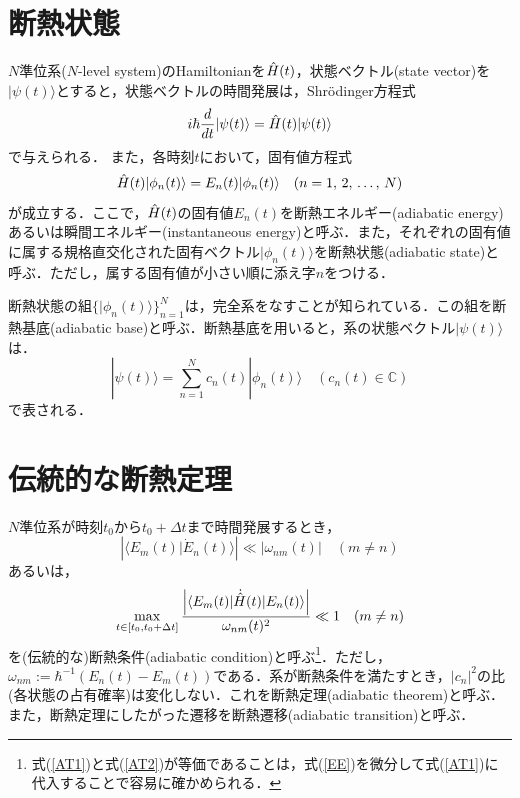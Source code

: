 \documentclass[a4paper, titlepage]{jsreport}
\begin{document}
\section{断熱状態}
$N$準位系($N$-level system)のHamiltonianを$\Hat{H}(t)$，状態ベクトル(state vector)を$|\psi(t)\rangle$とすると，状態ベクトルの時間発展は，Shr\"{o}dinger方程式
\begin{equation}
  \label{SE}
  i\hbar \frac{d}{dt} |\psi(t) \rangle = \Hat{H}(t) |\psi(t) \rangle
\end{equation}
で与えられる．
また，各時刻$t$において，固有値方程式
\begin{equation} 
  \Hat{H}(t) |\phi_n(t) \rangle = E_n(t) |\phi_n(t) \rangle \quad (n = 1,\,2,\,\ldots,\,N) \label{EE}
\end{equation}
が成立する．ここで，$\Hat{H}(t)$の固有値$E_n(t)$を断熱エネルギー(adiabatic energy)あるいは瞬間エネルギー(instantaneous energy)と呼ぶ．また，それぞれの固有値に属する規格直交化された固有ベクトル$|\phi_n(t) \rangle$を断熱状態(adiabatic state)と呼ぶ．ただし，属する固有値が小さい順に添え字$n$をつける．


断熱状態の組$\{|\phi_n(t) \rangle\}_{n=1}^N$は，完全系をなすことが知られている．この組を断熱基底(adiabatic base)と呼ぶ．断熱基底を用いると，系の状態ベクトル$|\psi(t)\rangle$は．
\begin{equation}
  |\psi(t) \rangle = \sum_{n=1}^{N} c_n(t) |\phi_n(t)\rangle  \quad (c_n(t) \in \mathbb{C})
\end{equation}
で表される．
\section{伝統的な断熱定理}
$N$準位系が時刻$t_0$から$t_0+\Delta t$まで時間発展するとき，
\begin{equation} \label{AT1}
  \left| \langle E_m(t) | \Dot{E}_n(t) \rangle \right| \ll \left| \omega_{nm}(t) \right| \quad (m\ne n)
\end{equation}
あるいは，
\begin{equation} \label{AT2}
  \max_{t\in [t_0, t_0+\Delta t]} \frac{\left| \langle E_m(t) |\Dot{\Hat{H}}(t)| E_n(t) \rangle \right|}{\omega_{nm}(t)^2} \ll 1 \quad (m\ne n)
\end{equation}
を(伝統的な)断熱条件(adiabatic condition)と呼ぶ\footnote{式(\ref{AT1})と式(\ref{AT2})が等価であることは，式(\ref{EE})を微分して式(\ref{AT1})に代入することで容易に確かめられる．}．ただし，$\omega_{nm} := \hbar^{-1} \left( E_n(t)-E_m(t) \right)$である．系が断熱条件を満たすとき，$|c_n|^2$の比(各状態の占有確率)は変化しない．これを断熱定理(adiabatic theorem)と呼ぶ．また，断熱定理にしたがった遷移を断熱遷移(adiabatic transition)と呼ぶ．
\end{document}
